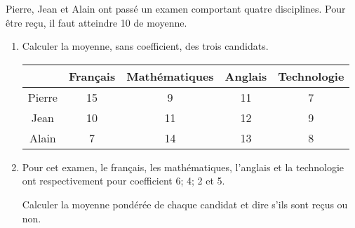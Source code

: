 
Pierre, Jean et Alain ont passé un examen comportant quatre
disciplines. Pour être reçu, il faut atteindre 10 de moyenne.
\begin{enumerate}
\item Calculer la moyenne, sans coefficient, des trois candidats.
\begin{center}
  \begin{tabular}{|c|c|c|c|c|}
\cline{2-5}
\multicolumn{1}{c|}{}&Français&Mathématiques&Anglais&Technologie\\
\hline
Pierre&15&9&11&7\\
\hline
Jean&10&11&12&9\\
\hline
Alain&7&14&13&8\\
\hline
  \end{tabular}
\end{center}
\item Pour cet examen, le français, les mathématiques, l'anglais et la
technologie ont respectivement pour coefficient 6; 4; 2 et 5.\par
Calculer la moyenne pondérée de chaque candidat et dire s'ils sont reçus
ou non.
\end{enumerate}
